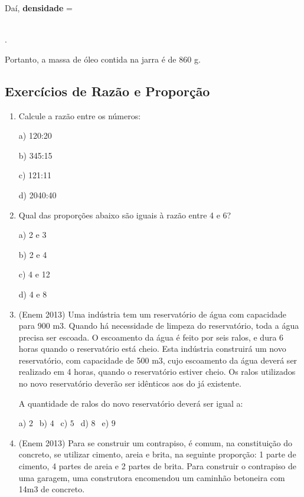 \begin{multicols*}{2}
\begin{enumerate}
		      Daí, \textbf{densidade} =

		      \\

		      .

		      Portanto, a massa de óleo contida na jarra é de 860 g.

	\end{enumerate}

	\subsection{Exercícios de Razão e Proporção}

	\begin{enumerate}

		\item Calcule a razão entre os números:

		      a) 120:20

		      b) 345:15

		      c) 121:11

		      d) 2040:40\\

		\item Qual das proporções abaixo são iguais à razão entre 4 e 6?

		      a) 2 e 3

		      b) 2 e 4

		      c) 4 e 12

		      d) 4 e 8\\

		\item (Enem 2013) Uma indústria tem um reservatório de água com capacidade para 900 m3. Quando há necessidade de limpeza do reservatório, toda a água precisa ser escoada. O escoamento da água é feito por seis ralos, e dura 6 horas quando o reservatório está cheio. Esta indústria construirá um novo reservatório, com capacidade de 500 m3, cujo escoamento da água deverá ser realizado em 4 horas, quando o reservatório estiver cheio. Os ralos utilizados no
		      novo reservatório deverão ser idênticos aos do já existente.

		      A quantidade de ralos do novo reservatório deverá ser igual a:

		      a) $2 \ \ $ b) $4 \ \ $ c) $5 \ \ $ d) $8 \ \ $ e) $9 \ \ $

		\item (Enem 2013) Para se construir um contrapiso, é comum, na constituição do concreto, se utilizar cimento, areia e brita, na seguinte proporção: 1 parte de cimento, 4 partes de areia e 2 partes de brita. Para construir o contrapiso de uma
		      garagem, uma construtora encomendou um caminhão betoneira com 14m3 de concreto.


\end{enumerate}
\end{multicols*}
